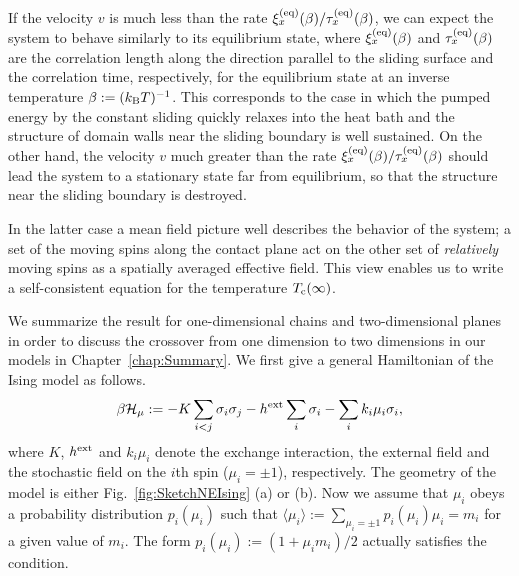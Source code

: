 If the velocity $v$ is much less than the rate $\xi^{(\rm eq)}_{x}(\beta)/\tau^{(\rm eq)}_{x}(\beta)$, we can expect the system to behave similarly to its equilibrium state, where $\xi^{(\rm eq)}_{x}(\beta)$ and $\tau^{(\rm eq)}_{x}(\beta)$ are the correlation length along the direction parallel to the sliding surface and the correlation time, respectively, for the equilibrium state at an inverse temperature $\beta:=(k_{\rm B}T)^{-1}$. This corresponds to the case in which the pumped energy by the constant sliding quickly relaxes into the heat bath and the structure of domain walls near the sliding boundary is well sustained. On the other hand, the velocity $v$ much greater than the rate $\xi^{(\rm eq)}_{x}(\beta)/\tau^{(\rm eq)}_{x}(\beta)$ should lead the system to a stationary state far from equilibrium, so that the structure near the sliding boundary is destroyed. 

In the latter case a mean field picture well describes the behavior of the system; a set of the moving spins along the contact plane act on the other set of \textit{relatively} moving spins as a spatially averaged effective field. This view enables us to write a self-consistent equation for the temperature $T_{\rm c}(\infty)$.

We summarize the result for one-dimensional chains and two-dimensional planes in order to discuss the crossover from one dimension to two dimensions in our models in Chapter~\ref{chap:Summary}. We first give a general Hamiltonian of the Ising model as follows.
\begin{align}
\beta \mathcal{H}_{\mu}:=-K\sum_{i<j}\sigma_{i}\sigma_{j}-h^{\rm ext}\sum_{i}\sigma_{i}-\sum_{i}k_{i}\mu_{i}\sigma_{i},
\end{align}
where $K$, $h^{\rm ext}$ and $k_{i}\mu_{i}$ denote the exchange interaction, the external field and the stochastic field on the $i$th spin ($\mu_{i}=\pm 1$), respectively. The geometry of the model is either Fig.~\ref{fig:SketchNEIsing} (a) or (b). Now we assume that $\mu_{i}$ obeys a probability distribution $p_{i}(\mu_{i})$ such that $\langle\mu_{i}\rangle:=\sum_{\mu_{i}=\pm 1}p_{i}(\mu_{i})\mu_{i}=m_{i}$ for a given  value of $m_{i}$. The form $p_{i}(\mu_{i}):=(1+\mu_{i}m_{i})/2$ actually satisfies the condition. 

